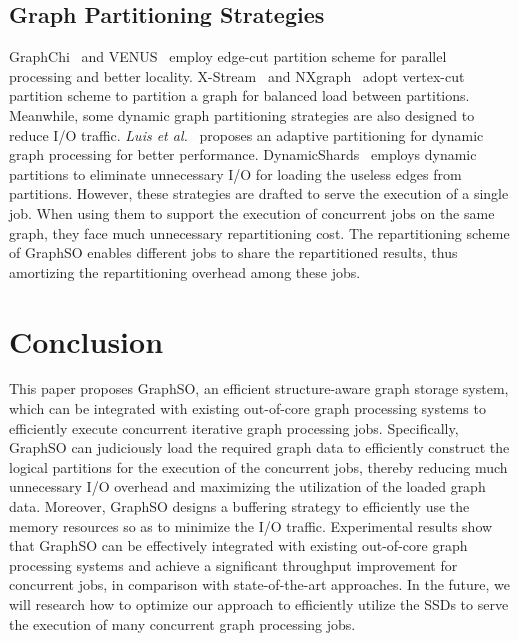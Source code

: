 \documentclass[10pt,journal,compsoc]{IEEEtran}
\begin{document}
\subsection{Graph Partitioning Strategies}
\vspace{-2pt}
GraphChi~\cite{GraphChi} and VENUS~\cite{VENUS} employ edge-cut partition scheme for parallel processing and better locality.
X-Stream~\cite{X-stream} and NXgraph~\cite{NXgraph} adopt vertex-cut partition scheme to partition a graph for balanced load between partitions.
Meanwhile, some dynamic graph partitioning strategies are also designed to reduce I/O traffic. {\em Luis et al.}~\cite{dynamic-graph} proposes an adaptive partitioning for dynamic graph processing for better performance.
DynamicShards~\cite{Vora} employs dynamic partitions to eliminate unnecessary I/O for loading the useless edges from partitions. However, these strategies are drafted to serve the execution of a single job. When using them to support the execution of concurrent jobs on the same graph, they face much unnecessary repartitioning cost. The repartitioning scheme of GraphSO enables different jobs to share the repartitioned results, thus amortizing the repartitioning overhead among these jobs.

\vspace{-10pt}
\section{Conclusion}\label{sec:6}
\vspace{-2pt}
This paper proposes GraphSO, an efficient structure-aware graph storage system, which can be integrated with existing out-of-core graph processing systems to efficiently execute concurrent iterative graph processing jobs.
Specifically, GraphSO can judiciously load the required graph data to efficiently construct the logical partitions for the execution of the concurrent jobs, thereby reducing much unnecessary I/O overhead and maximizing the utilization of the loaded graph data.
Moreover, GraphSO designs a buffering strategy to efficiently use the memory resources so as to minimize the I/O traffic.
Experimental results show that GraphSO can be effectively integrated with existing out-of-core graph processing systems and achieve a significant throughput improvement for concurrent jobs, in comparison with state-of-the-art approaches. In the future, we will research how to optimize our approach to efficiently utilize the SSDs to serve the execution of many concurrent graph processing jobs.
\end{document}
